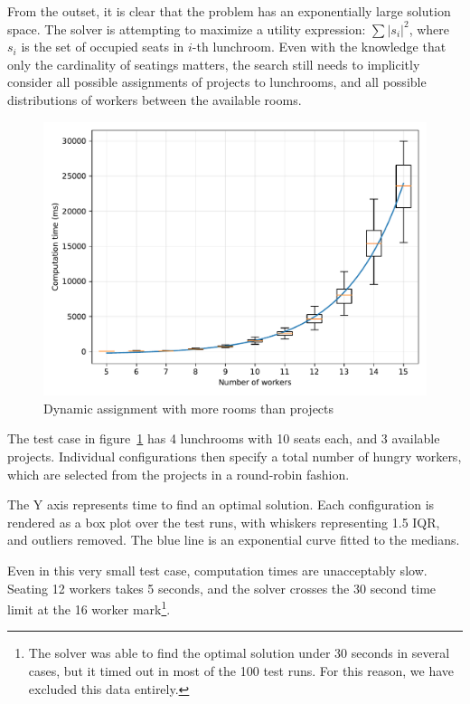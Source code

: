 From the outset, it is clear that the problem has an exponentially large solution space.
The solver is attempting to maximize a utility expression: $\sum |s_i|^2$, where $s_i$
is the set of occupied seats in $i$-th lunchroom. Even with the knowledge that only the
cardinality of seatings matters, the search still needs to implicitly consider all
possible assignments of projects to lunchrooms, and all possible distributions of
workers between the available rooms.

\begin{figure}[ht]
    \centering
    \includegraphics[width=1\linewidth]{img/workers-morerooms.pdf}
    \caption{Dynamic assignment with more rooms than projects}
    \label{fig:workers-morerooms}
\end{figure}

The test case in figure~\ref{fig:workers-morerooms} has 4 lunchrooms with 10 seats
each, and 3 available projects. Individual configurations then specify a total number
of hungry workers, which are selected from the projects in a round-robin fashion.

The Y axis represents time to find an optimal solution. Each configuration is rendered
as a box plot over the test runs, with whiskers representing 1.5 IQR, and outliers
removed. The blue line is an exponential curve fitted to the medians.

Even in this very small test case, computation times are unacceptably slow. Seating 12
workers takes 5 seconds, and the solver crosses the 30 second time limit at the 16
worker mark\footnote{The solver was able to find the optimal solution under 30 seconds
in several cases, but it timed out in most of the 100 test runs. For this reason, we
have excluded this data entirely.}.

